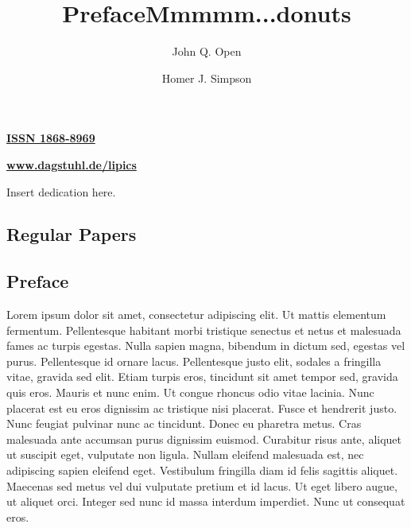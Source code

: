 \documentclass[a4paper,UKenglish]{lipicsmaster}
\begin{document}
\begin{publicationinfo}
 \bigskip
 \bigskip
 \bigskip

{\large\bf\sffamily \href{http://drops.dagstuhl.de/lipics}{ISSN 1868-8969}}

 \bigskip
 \bigskip
 \bigskip

{\Large\bf\sffamily \href{http://www.dagstuhl.de/lipics}{www.dagstuhl.de/lipics}}
 
 \vfill
 
 \newpage
 
 \thispagestyle{empty}
 
\end{publicationinfo}


\begin{dedication}%
  Insert dedication here.
\end{dedication}


\begin{contentslist}

\contitem
\title{Preface}
\author{John Q. Open}

\part{Regular Papers}

\contitem
\title{Mmmmm...donuts}
\author{Homer J. Simpson}


\end{contentslist}



\chapter{Preface} %

Lorem ipsum dolor sit amet, consectetur adipiscing elit. Ut mattis
elementum fermentum. Pellentesque habitant morbi tristique senectus et
netus et malesuada fames ac turpis egestas. Nulla sapien magna,
bibendum in dictum sed, egestas vel purus. Pellentesque id ornare
lacus. Pellentesque justo elit, sodales a fringilla vitae, gravida sed
elit. Etiam turpis eros, tincidunt sit amet tempor sed, gravida quis
eros. Mauris et nunc enim. Ut congue rhoncus odio vitae lacinia. Nunc
placerat est eu eros dignissim ac tristique nisi placerat. Fusce et
hendrerit justo. Nunc feugiat pulvinar nunc ac tincidunt. Donec eu
pharetra metus. Cras malesuada ante accumsan purus dignissim
euismod. Curabitur risus ante, aliquet ut suscipit eget, vulputate non
ligula. Nullam eleifend malesuada est, nec adipiscing sapien eleifend
eget. Vestibulum fringilla diam id felis sagittis aliquet. Maecenas
sed metus vel dui vulputate pretium et id lacus. Ut eget libero augue,
ut aliquet orci. Integer sed nunc id massa interdum imperdiet. Nunc ut
consequat eros.
\end{document}
